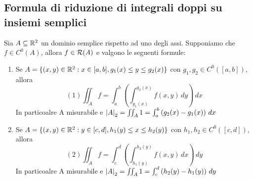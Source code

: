\subsection{Formula di riduzione di integrali doppi su insiemi semplici}
\begin{theorem}
  Sia $A\subseteq\mathbb{R}^2$ un dominio semplice rispetto ad uno degli assi. Supponiamo che $f\in C^{0}(A)$, allora 
  $f\in\mathcal{R}(A)$ e valgono le seguenti formule:
  \begin{enumerate}
    \item Se $A = \{(x,y)\in\mathbb{R}^2 : x \in [a,b], g_1(x) \leq y \leq g_2(x)\}$ con $g_1, g_2 \in C^0([a,b])$, allora 
          $$(1) \iint_{A} f = \int_{a}^{b} \left(\int_{g_1(x)}^{g_2(x)} f(x,y) \, dy\right) \, dx$$
          In particoalre A \ace misurabile e $\left\lvert A \right\rvert_2 = \iint_{A} 1 = \int_{a}^{b} \left(g_2(x)-g_1(x)\right) \, dx$
    \item Se $A = \{(x,y)\in\mathbb{R}^2 : y \in [c,d], h_1(y) \leq x \leq h_2(y)\}$ con $h_1, h_2 \in C^0([c,d])$, allora 
          $$(2) \iint_{A} f = \int_{c}^{d} \left(\int_{h_1(y)}^{h_2(y)} f(x,y) \, dx\right) \, dy$$
          In particoalre A \ace misurabile e $\left\lvert A \right\rvert_2 = \iint_{A} 1 = \int_{c}^{d} \left(h_2(y)-h_1(y)\right) \, dy$
  \end{enumerate}
\end{theorem}